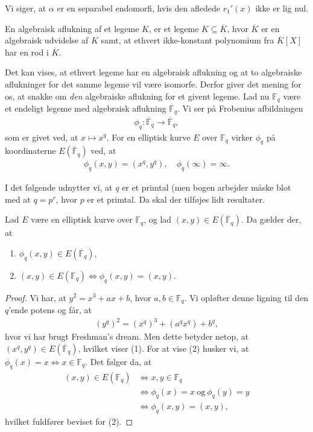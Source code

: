 Vi siger, at $\alpha$ er en separabel endomorfi, hvis den afledede $r_1'(x)$ ikke
er lig nul.


\begin{definition}
En algebraisk aflukning af et legeme $K$, er et legeme
$K \subseteq \overline{K}$, hvor $\overline{K}$ er en 
algebraisk udvidelse af $K$ samt, at ethvert ikke-konstant
polynomium fra $\overline{K}[X]$ har en rod i $\overline{K}$. 
\end{definition}

Det kan vises, at ethvert legeme har en algebraisk aflukning og
at to algebraiske aflukninger for det samme legeme vil være isomorfe.
Derfor giver det mening for os, at snakke om \emph{den} algebraiske
aflukning for et givent legeme. Lad nu $\mathbb{F}_q$ være et endeligt
legeme med algebraisk aflukning $\overline{\mathbb{F}}_q$. Vi ser på
Frobenius afbildningen 
\begin{align*}
	\phi_q : \overline{\mathbb{F}}_q \to \overline{\mathbb{F}}_q,
\end{align*}
som er givet ved, at $x \mapsto x^q$. For en elliptisk kurve $E$ over
$\mathbb{F}_q$ virker $\phi_q$ på koordinaterne $E(\overline{\mathbb{F}}_q)$ 
ved, at 
\begin{align*}
	\phi_q(x, y) = (x^q, y^q), \quad \phi_q (\infty) = \infty.
\end{align*}

I det følgende udnytter vi, at $q$ er et primtal (men bogen arbejder
måske blot med at $q = p^r$, hvor $p$ er et primtal. Da skal der tilføjes
lidt resultater.

\begin{lemma}
Lad $E$ være en elliptisk kurve over $\mathbb{F}_q$, og lad 
$(x, y) \in E(\overline{\mathbb{F}}_q)$. Da gælder der, at 
\begin{enumerate}
	\item $\phi_q(x, y) \in E(\overline{\mathbb{F}}_q)$,
	\item $(x, y) \in E(\mathbb{F}_q) \Leftrightarrow \phi_q(x, y)=(x, y)$.
\end{enumerate}
\end{lemma}
\begin{proof}
Vi har, at $y^2 = x^3 + ax + b$, hvor $a, b \in \mathbb{F}_q$. Vi opløfter 
denne ligning til den $q$'ende potens og får, at 
\begin{align*}
	(y^q)^2 = (x^q)^3 + (a^q x^q) + b^q,
\end{align*}
hvor vi har brugt Freshman's dream. Men dette betyder netop, at 
$(x^q, y^q) \in E(\overline{\mathbb{F}}_q)$, hvilket viser (1).
For at vise (2) husker vi, at $\phi_q(x) = x \Leftrightarrow x \in \mathbb{F}_q$.
Det følger da, at 
\begin{align*}
	(x, y) \in E(\mathbb{F}_q) &\Leftrightarrow x, y \in \mathbb{F}_q \\
	&\Leftrightarrow \phi_q(x) = x \ \text{og} \ \phi_q(y) = y \\
	&\Leftrightarrow \phi_q(x, y) = (x, y),
\end{align*}
hvilket fuldfører beviset for (2).
\end{proof}

